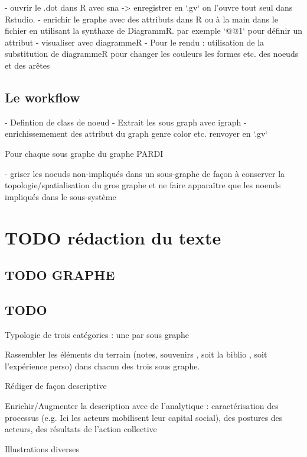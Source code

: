 - ouvrir le .dot dans R avec sna -> enregistrer en `.gv` on l'ouvre tout seul dans Rstudio. 
- enrichir le graphe avec des attributs dans R ou à la main dans le fichier en utilisant la synthaxe de DiagrammR. par exemple `@@1` pour définir un attribut 
- visualiser avec diagrammeR
- Pour le rendu : utilisation de la substitution de diagrammeR pour changer les couleurs les formes etc.  des noeuds et des arêtes

\subsection{ Le workflow}
- Defintion de class de noeud
- Extrait les sous graph avec igraph
- enrichissemement des attribut du graph genre color etc.
renvoyer en `.gv`

Pour chaque sous graphe du graphe PARDI 

-  griser les noeuds non-impliqués dans un sous-graphe de façon à conserver la topologie/spatialisation du gros graphe et ne faire apparaître que les noeuds impliqués dans le sous-système



\section{TODO rédaction du texte }

\subsection{TODO GRAPHE}

\subsection{ TODO }

Typologie de trois catégories : une par sous graphe 

Rassembler les éléments du terrain (notes, souvenirs , soit la biblio , soit l'expérience perso) dans chacun des trois sous graphe.

Rédiger de façon descriptive

Enrichir/Augmenter la description avec de l'analytique  : caractérisation des processus (e.g. Ici les acteurs mobilisent leur capital social), des postures des acteurs, des résultats de l'action collective 


Illustrations diverses

